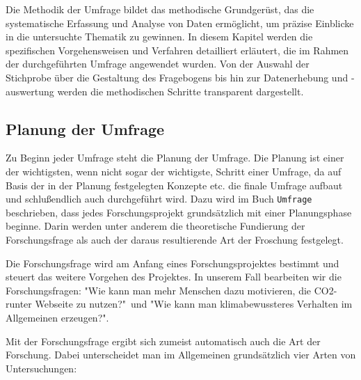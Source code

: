 Die Methodik der Umfrage bildet das methodische Grundgerüst, das die systematische Erfassung und Analyse von Daten ermöglicht, um präzise Einblicke in die untersuchte Thematik zu gewinnen. In diesem Kapitel werden die spezifischen Vorgehensweisen und Verfahren detailliert erläutert, die im Rahmen der durchgeführten Umfrage angewendet wurden.
Von der Auswahl der Stichprobe über die Gestaltung des Fragebogens bis hin zur Datenerhebung und -auswertung werden die methodischen Schritte transparent dargestellt.

\subsection{Planung der Umfrage}
Zu Beginn jeder Umfrage steht die Planung der Umfrage.
Die Planung ist einer der wichtigsten, wenn nicht sogar der wichtigste, Schritt einer Umfrage, da auf Basis der in der Planung festgelegten Konzepte etc.
die finale Umfrage aufbaut und schlußendlich auch durchgeführt wird.
Dazu wird im Buch \texttt{Umfrage} beschrieben, dass jedes Forschungsprojekt grundsätzlich mit einer Planungsphase beginne.
Darin werden unter anderem die theoretische Fundierung der Forschungsfrage als auch der daraus resultierende Art der Froschung festgelegt.\cite{umfrage:2011}

Die Forschungsfrage wird am Anfang eines Forschungsprojektes bestimmt und steuert das weitere Vorgehen des Projektes. \cite{umfrage:2011}
In unserem Fall bearbeiten wir die Forschungsfragen: "Wie kann man mehr Menschen dazu motivieren, die CO2-runter Webseite zu nutzen?"\ und "Wie kann man klimabewussteres Verhalten im Allgemeinen erzeugen?".

Mit der Forschungsfrage ergibt sich zumeist automatisch auch die Art der Forschung.
Dabei unterscheidet man im Allgemeinen grundsätzlich vier Arten von Untersuchungen:

